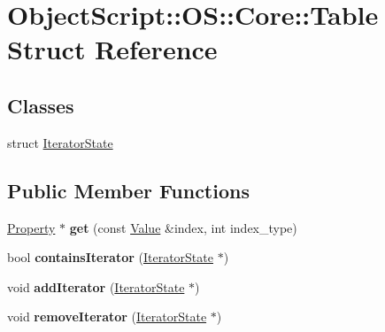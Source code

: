\hypertarget{struct_object_script_1_1_o_s_1_1_core_1_1_table}{}\section{Object\+Script\+:\+:OS\+:\+:Core\+:\+:Table Struct Reference}
\label{struct_object_script_1_1_o_s_1_1_core_1_1_table}
\subsection*{Classes}
\begin{DoxyCompactItemize}
\item 
struct \hyperlink{struct_object_script_1_1_o_s_1_1_core_1_1_table_1_1_iterator_state}{Iterator\+State}
\end{DoxyCompactItemize}
\subsection*{Public Member Functions}
\begin{DoxyCompactItemize}
\item 
\hyperlink{struct_object_script_1_1_o_s_1_1_core_1_1_property}{Property} $\ast$ {\bfseries get} (const \hyperlink{struct_object_script_1_1_o_s_1_1_core_1_1_value}{Value} \&index, int index\+\_\+type)\hypertarget{struct_object_script_1_1_o_s_1_1_core_1_1_table_a17fc73bddbfde3863279ca3b4117a93e}{}\label{struct_object_script_1_1_o_s_1_1_core_1_1_table_a17fc73bddbfde3863279ca3b4117a93e}

\item 
bool {\bfseries contains\+Iterator} (\hyperlink{struct_object_script_1_1_o_s_1_1_core_1_1_table_1_1_iterator_state}{Iterator\+State} $\ast$)\hypertarget{struct_object_script_1_1_o_s_1_1_core_1_1_table_aee43ae2e3d149c51eae6e035829b23f4}{}\label{struct_object_script_1_1_o_s_1_1_core_1_1_table_aee43ae2e3d149c51eae6e035829b23f4}

\item 
void {\bfseries add\+Iterator} (\hyperlink{struct_object_script_1_1_o_s_1_1_core_1_1_table_1_1_iterator_state}{Iterator\+State} $\ast$)\hypertarget{struct_object_script_1_1_o_s_1_1_core_1_1_table_a3b5b235a30d474b766f791560141d54f}{}\label{struct_object_script_1_1_o_s_1_1_core_1_1_table_a3b5b235a30d474b766f791560141d54f}

\item 
void {\bfseries remove\+Iterator} (\hyperlink{struct_object_script_1_1_o_s_1_1_core_1_1_table_1_1_iterator_state}{Iterator\+State} $\ast$)\hypertarget{struct_object_script_1_1_o_s_1_1_core_1_1_table_ae99f57fbc2011ec03dab4d19da65a200}{}\label{struct_object_script_1_1_o_s_1_1_core_1_1_table_ae99f57fbc2011ec03dab4d19da65a200}

\end{DoxyCompactItemize}
